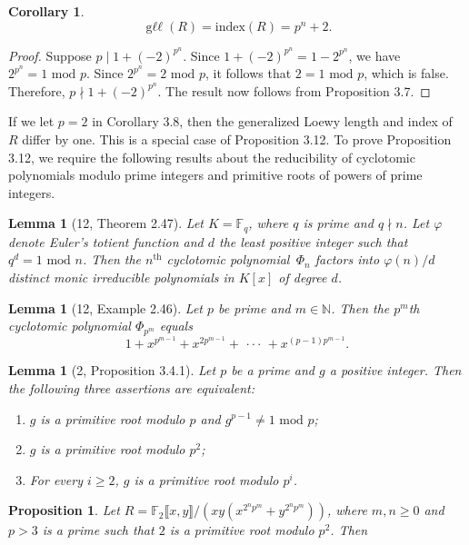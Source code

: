 \documentclass{amsart}
\newtheorem{proposition}[theorem]{Proposition}
\newtheorem{lemma}[theorem]{Lemma}
\newtheorem{corollary}[theorem]{Corollary}
\theoremstyle{definition}
\theoremstyle{definition}
\DeclareMathOperator{\gll}{\text{g}\ell\ell}
\numberwithin{equation}{section}
\theoremstyle{definition}
\begin{document}
{\begin{corollary}
\[\gll(R)=\text{index}(R)=p^{n}+2.
\] \end{corollary}
\begin{proof} Suppose $p \mid 1+(-2)^{p^{n}}$. Since $1+(-2)^{p^{n}}=1-2^{p^{n}}$, we have $2^{p^{n}}=1 \text{ mod }p$. Since $2^{p^{n}}=2 \text{ mod }p$, it follows that $2=1 \text{ mod }p$, which is false. Therefore, $p \nmid 1+(-2)^{p^{n}}$. The result now follows from Proposition 3.7.\end{proof} \text{}\newline 
If we let $p=2$ in Corollary 3.8, then the generalized Loewy length and index of $R$ differ by one. This is a special case of Proposition 3.12. To prove Proposition 3.12, we require the following results about the reducibility of cyclotomic polynomials modulo prime integers and primitive roots of powers of prime integers. \newline
\begin{lemma}[12, Theorem 2.47] Let $K=\mathbb{F}_{q}$, where $q$ is prime and $q \nmid n$. Let $\varphi$ denote Euler's totient function and $d$ the least positive integer such that $q^{d}=1 \text{ mod } n$. Then the $n^{\text{th}}$ cyclotomic polynomial \,$\Phi_{n}$ factors into $\varphi(n)/d$ distinct monic irreducible polynomials in $K[x]$ of degree $d$.  
\end{lemma} \text{} \begin{lemma}[12, Example 2.46] Let $p$ be prime and $m \in \mathbb{N}$. Then the $p^{m}$th cyclotomic polynomial $\Phi_{p^{m}}$ equals \[1+x^{p^{m-1}}+x^{2p^{m-1}}+\,\cdot \cdot \cdot\, +x^{(p-1)p^{m-1}}. 
\]\end{lemma}\text{}
\begin{lemma}[2, Proposition 3.4.1] Let $p$ be a prime and $g$ a positive integer. Then the following three assertions are equivalent: \begin{enumerate} 
\item $g$ is a primitive root modulo $p$ and $g^{p-1} \neq 1 \text{ mod } p$;  
\item $g$ is a primitive root modulo $p^2$; 
\item For every $i \geq 2$, $g$ is a primitive root modulo $p^{i}$.\end{enumerate} \end{lemma} \text\newline
\begin{proposition} Let $R=\mathbb{F}_{2}\llbracket x,y \rrbracket/(xy(x^{2^{n}p^{m}}+y^{2^{n}p^{m}}))$,
where $m,n \geq 0$ and $p>3$ is a prime such that $2$ is a primitive root modulo $p^2$. Then \newline

\end{proposition}}
\end{document}
